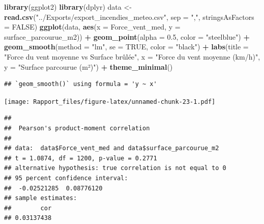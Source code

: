 \documentclass[
]{article}
\newenvironment{Shaded}{\begin{snugshade}}{\end{snugshade}}
\newcommand{\AttributeTok}[1]{\textcolor[rgb]{0.13,0.29,0.53}{#1}}
\newcommand{\ConstantTok}[1]{\textcolor[rgb]{0.56,0.35,0.01}{#1}}
\newcommand{\FloatTok}[1]{\textcolor[rgb]{0.00,0.00,0.81}{#1}}
\newcommand{\FunctionTok}[1]{\textcolor[rgb]{0.13,0.29,0.53}{\textbf{#1}}}
\newcommand{\NormalTok}[1]{#1}
\newcommand{\OtherTok}[1]{\textcolor[rgb]{0.56,0.35,0.01}{#1}}
\newcommand{\SpecialCharTok}[1]{\textcolor[rgb]{0.81,0.36,0.00}{\textbf{#1}}}
\newcommand{\StringTok}[1]{\textcolor[rgb]{0.31,0.60,0.02}{#1}}
\begin{document}
\begin{Shaded}
\begin{Highlighting}[]
\FunctionTok{library}\NormalTok{(ggplot2)}
\FunctionTok{library}\NormalTok{(dplyr)}
\NormalTok{data }\OtherTok{\textless{}{-}} \FunctionTok{read.csv}\NormalTok{(}\StringTok{"../Exports/export\_incendies\_meteo.csv"}\NormalTok{, }\AttributeTok{sep =} \StringTok{","}\NormalTok{, }\AttributeTok{stringsAsFactors =} \ConstantTok{FALSE}\NormalTok{)}
\FunctionTok{ggplot}\NormalTok{(data, }\FunctionTok{aes}\NormalTok{(}\AttributeTok{x =}\NormalTok{ Force\_vent\_med, }\AttributeTok{y =}\NormalTok{ surface\_parcourue\_m2)) }\SpecialCharTok{+}
  \FunctionTok{geom\_point}\NormalTok{(}\AttributeTok{alpha =} \FloatTok{0.5}\NormalTok{, }\AttributeTok{color =} \StringTok{"steelblue"}\NormalTok{) }\SpecialCharTok{+}
  \FunctionTok{geom\_smooth}\NormalTok{(}\AttributeTok{method =} \StringTok{"lm"}\NormalTok{, }\AttributeTok{se =} \ConstantTok{TRUE}\NormalTok{, }\AttributeTok{color =} \StringTok{"black"}\NormalTok{) }\SpecialCharTok{+}
  \FunctionTok{labs}\NormalTok{(}\AttributeTok{title =} \StringTok{"Force du vent moyenne vs Surface brûlée"}\NormalTok{,}
       \AttributeTok{x =} \StringTok{"Force du vent moyenne (km/h)"}\NormalTok{,}
       \AttributeTok{y =} \StringTok{"Surface parcourue (m²)"}\NormalTok{) }\SpecialCharTok{+}
  \FunctionTok{theme\_minimal}\NormalTok{()}
\end{Highlighting}
\end{Shaded}

\begin{verbatim}
## `geom_smooth()` using formula = 'y ~ x'
\end{verbatim}

\texttt{[image: Rapport\_files/figure-latex/unnamed-chunk-23-1.pdf]}

\begin{Shaded}
\end{Shaded}

\begin{verbatim}
## 
##  Pearson's product-moment correlation
## 
## data:  data$Force_vent_med and data$surface_parcourue_m2
## t = 1.0874, df = 1200, p-value = 0.2771
## alternative hypothesis: true correlation is not equal to 0
## 95 percent confidence interval:
##  -0.02521285  0.08776120
## sample estimates:
##        cor 
## 0.03137438
\end{verbatim}
\end{document}

